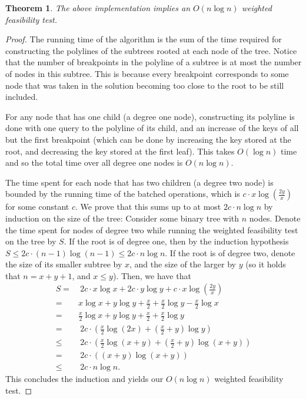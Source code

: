 \documentclass[11pt,a4paper]{article}
\newtheorem{theorem}{Theorem}[section]
\theoremstyle{definition}
\theoremstyle{remark}
\begin{document}
\begin{theorem}
\label{nlogn weighted f.t. theorem}
The above implementation implies an $O(n \log n)$ weighted feasibility test.
\end{theorem}
\begin{proof}The running time of the algorithm is the sum of the time required for constructing the polylines of the subtrees rooted at each node of the tree.
%
Notice that the number of breakpoints in the polyline of a subtree is at most the number of nodes in this subtree. This is because every breakpoint corresponds to some node that was taken in the solution becoming too close to the root to be still included.

For any node that has one child (a degree one node), constructing its polyline is done with one query to the polyline of its child, and an increase of the keys of all but the first breakpoint (which can be done by increasing the key stored at the root, and decreasing the key stored at the first leaf). This takes $O(\log n)$ time and so the total time over all degree one nodes is $O(n \log n)$.
 
The time spent for each node that has two children (a degree two node) is bounded by the running time of the batched operations, which is $c\cdot x \log (\frac{2y}{x})$ for some constant $c$. We prove that this sums up to at most $2c \cdot n \log n$ by induction on the size of the  tree: Consider some binary tree with $n$ nodes. Denote the time spent for nodes of degree two while running the weighted feasibility test on the tree by $S$. If the root is of degree one, then by the induction hypothesis $S \leq 2c\cdot (n-1)\log(n-1)\leq 2c\cdot n \log n$. If the root is of degree two, denote the size of its smaller subtree by $x$, and the size of the larger by $y$ (so it holds that $n=x+y+1$, and $x \leq y$). Then, we have that
\begin{align*}
S = & \ 2c\cdot x \log x + 2c\cdot y \log y + c\cdot x \log (\frac{2y}{x})\\
 = & x\log x+y\log y+\frac{x}{2}+\frac{x}{2}\log y-\frac{x}{2}\log x \\
= & \frac{x}{2}\log x+y\log y+\frac{x}{2}+\frac{x}{2}\log y \\
= & \ 2c\cdot (\frac{x}{2}\log(2x)+(\frac{x}{2}+y)\log y) \\
\leq & \ 2c\cdot (\frac{x}{2}\log(x+y)+(\frac{x}{2}+y)\log (x+y)) \\
= & \ 2c\cdot ((x+y)\log(x+y)) \\
\leq & \ 2c\cdot n \log n.
\end{align*}
This concludes the induction and yields our $O(n \log n)$ weighted feasibility test.
\end{proof}





\end{document}
